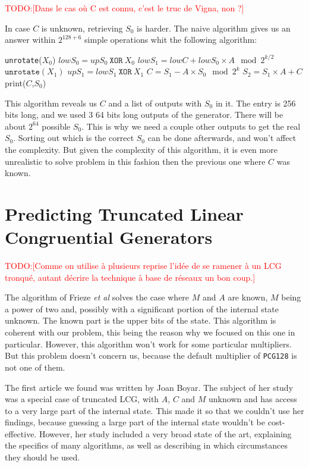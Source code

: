 \documentclass[preprint]{iacrtrans}
\newcommand{\todo}[1]{\textcolor{red}{TODO:[#1]}}
\begin{document}
\todo{Dans le cas où C est connu, c'est le truc de Vigna, non ?}


In case $C$ is unknown, retrieving $S_0$ is harder. The naive algorithm gives us
an answer within $2^{128+6}$ simple operations whit the following algorithm:

\begin{algorithmic}[!h]
    \STATE \texttt{unrotate}($X_0$)
    \STATE $lowS_0 = upS_0\ \mathtt{XOR}\ X_0$
    \STATE $lowS_1 = lowC + lowS_0 \times A \mod{2^{k/2}}$
        \STATE $\mathtt{unrotate}(X_1)$
        \STATE $upS_1 = lowS_1\ \mathtt{XOR}\ X_1$
        \STATE $C = S_1 - A \times S_0 \mod{2^{k}}$
        \STATE $S_2 = S_1 \times A + C$
            \STATE print($C$,$S_0$)
        \ENDIF
    \ENDFOR
\ENDFOR
\end{algorithmic}

This algorithm reveals us $C$ and a list of outputs with $S_0$ in it. The entry
is 256 bits long, and we used 3 64 bits long outputs of the generator. There
will be about $2^{64}$ possible $S_0$. This is why we need a couple other
outputs to get the real $S_0$. Sorting out which is the correct $S_0$ can be
done afterwards, and won't affect the complexity. But given the complexity of
this algorithm, it is even more unrealistic to solve problem in this fashion
then the previous one where $C$ was known.


\section{Predicting Truncated Linear Congruential Generators}

\todo{Comme on utilise à plusieurs reprise l'idée de se ramener à un LCG
  tronqué, autant décrire la technique à base de réseaux un bon coup.}

The algorithm of Frieze \textit{et al}\cite{Frieze} solves the case where $M$
and $A$ are known, $M$ being a power of two and, possibly with a significant
portion of the internal state unknown. The known part is the upper bits of the
state. This algorithm is coherent with our problem, this being the reason why we
focused on this one in particular. However, this algorithm won't work for some
particular multipliers. But this problem doesn't concern us, because the default
multiplier of \texttt{PCG128} is not one of them.

The first article we found was written by Joan Boyar\cite{Boyar1989}. The
subject of her study was a special case of truncated LCG, with $A$, $C$ and $M$
unknown and has access to a very large part of the internal state. This made it
so that we couldn't use her findings, because guessing a large part of the
internal state wouldn't be cost-effective. However, her study included a very
broad state of the art, explaining the specifics of many algorithms, as well as
describing in which circumstances they should be used.
\end{document}
